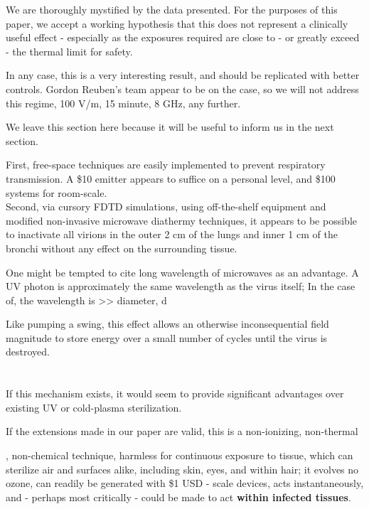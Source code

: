 \documentclass[paper.tex]{subfiles}
\begin{document}
\begin{multicols}{1}
We are thoroughly mystified by the data presented. For the purposes of this paper, we accept a working hypothesis that this does not represent a clinically useful effect - especially as the exposures required are close to - or greatly exceed - the thermal limit for safety.

In any case, this is a very interesting result, and should be replicated with better controls. Gordon Reuben's team appear to be on the case, so we will not address this regime, 100 V/m, 15 minute, 8 GHz, any further.

We leave this section here because it will be useful to inform us in the next section.



First, free-space techniques are easily implemented to prevent respiratory transmission. A \$10 emitter appears to suffice on a personal level, and \$100 systems for room-scale.\\


Second, via cursory FDTD simulations, using off-the-shelf equipment and modified non-invasive microwave diathermy techniques, it appears to be possible to inactivate all virions in the outer 2 cm of the lungs and inner 1 cm of the bronchi without any effect on the surrounding tissue. 




One might be tempted to cite long wavelength of microwaves as an advantage. A UV photon is approximately the same wavelength as the virus itself;  In the case of, the wavelength is >> diameter, d




Like pumping a swing, this effect allows an otherwise inconsequential field magnitude to store energy over a small number of cycles until the virus is destroyed. \\
\\\\



If this mechanism exists, it would seem to provide significant advantages over existing UV or cold-plasma sterilization. 

If the extensions made in our paper are valid, this is a non-ionizing, non-thermal

, non-chemical technique, harmless for continuous exposure to tissue, which can sterilize air and surfaces alike, including skin, eyes, and within hair; it evolves no ozone, can readily be generated with \$1 USD - scale devices, acts instantaneously, and - perhaps most critically - could be made to act {\bf within infected tissues}.





\end{multicols}
\end{document}
